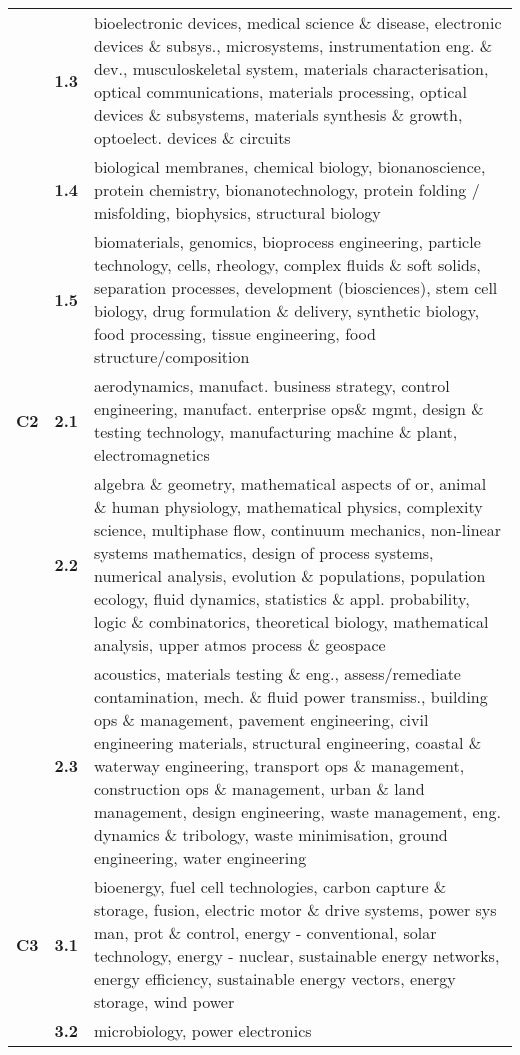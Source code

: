 \begin{spacing}{0.9}
\begin{longtable}[r]{r|r|p{11.5cm}}
& \textbf{1.3} & {bioelectronic devices, medical science \& disease, electronic devices \& subsys., microsystems, instrumentation eng. \& dev., musculoskeletal system, materials characterisation, optical communications, materials processing, optical devices \& subsystems, materials synthesis \& growth, optoelect. devices \& circuits}\\
& \textbf{1.4} & {biological membranes, chemical biology, bionanoscience, protein chemistry, bionanotechnology, protein folding / misfolding, biophysics, structural biology}\\
& \textbf{1.5} & {biomaterials, genomics, bioprocess engineering, particle technology, cells, rheology, complex fluids \& soft solids, separation processes, development (biosciences), stem cell biology, drug formulation \& delivery, synthetic biology, food processing, tissue engineering, food structure/composition}\\
\hline
\textbf{C2}
& \textbf{2.1} & {aerodynamics, manufact. business strategy, control engineering, manufact. enterprise ops\& mgmt, design \& testing technology, manufacturing machine \& plant, electromagnetics
}\\
& \textbf{2.2} & {algebra \& geometry, mathematical aspects of or, animal \& human physiology, mathematical physics, complexity science, multiphase flow, continuum mechanics, non-linear systems mathematics, design of process systems, numerical analysis, evolution \& populations, population ecology, fluid dynamics, statistics \& appl. probability, logic \& combinatorics, theoretical biology, mathematical analysis, upper atmos process \& geospace}\\
& \textbf{2.3} & {acoustics, materials testing \& eng., assess/remediate contamination, mech. \& fluid power transmiss., building ops \& management, pavement engineering, civil engineering materials, structural engineering, coastal \& waterway engineering, transport ops \& management, construction ops \& management, urban \& land management, design engineering, waste management, eng. dynamics \& tribology, waste minimisation, ground engineering, water engineering}\\
\hline
\textbf{C3}
& \textbf{3.1} & {bioenergy, fuel cell technologies, carbon capture \& storage, fusion, electric motor \& drive systems, power sys man, prot \& control, energy - conventional, solar technology, energy - nuclear, sustainable energy networks, energy efficiency, sustainable energy vectors, energy storage, wind power}\\
& \textbf{3.2} & {microbiology, power electronics}\\

\end{longtable}
\end{spacing}
